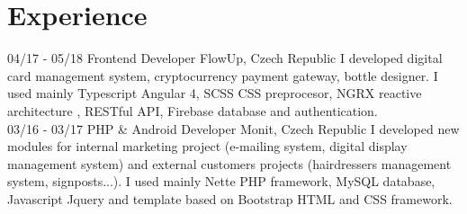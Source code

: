 \documentclass[]{friggeri-cv}
\begin{document}
\section{Experience}
\begin{entrylist}
 \entry
    {04/17 - 05/18}
    {Frontend Developer}
    {FlowUp, Czech Republic}
    {I developed digital card management system, cryptocurrency payment gateway,  bottle designer.  I used mainly Typescript Angular 4, SCSS CSS preprocesor, NGRX  reactive architecture , RESTful API, Firebase database and authentication.\\}
\entry
    {03/16 - 03/17}
    {PHP \& Android Developer}
    {Monit, Czech Republic}
    {I developed new modules for internal marketing project (e-mailing system, digital display management system) and external customers projects (hairdressers management system, signposts...). I used mainly Nette PHP framework, MySQL database, Javascript Jquery and template based on Bootstrap HTML and CSS framework.\\}
\end{entrylist}
\end{document}
